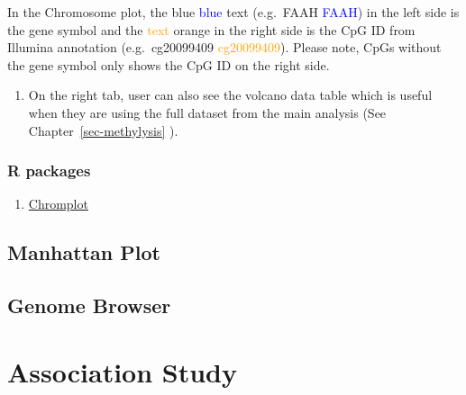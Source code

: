 \documentclass[
  a4paper,
  DIV=11,
  numbers=noendperiod,
  oneside,
  open=any]{scrreport}
\providecommand{\tightlist}{%
  \setlength{\itemsep}{0pt}\setlength{\parskip}{0pt}}\usepackage{longtable,booktabs,array}
\begin{document}
\begin{tcolorbox}[enhanced jigsaw, breakable, colback=white, colbacktitle=quarto-callout-note-color!10!white, opacityback=0, left=2mm, bottomrule=.15mm, opacitybacktitle=0.6, coltitle=black, bottomtitle=1mm, toprule=.15mm, toptitle=1mm, arc=.35mm, titlerule=0mm, rightrule=.15mm, title=\textcolor{quarto-callout-note-color}{\faInfo}\hspace{0.5em}{Note}, colframe=quarto-callout-note-color-frame, leftrule=.75mm]

In the Chromosome plot, the {blue} \textcolor{blue}{blue} text
(e.g.~{FAAH} \textcolor{blue}{FAAH}) in the left side is the gene symbol
and the \textcolor{orange}{text} {orange} in the right side is the CpG
ID from Illumina annotation (e.g.~{cg20099409}
\textcolor{orange}{cg20099409}). Please note, CpGs without the gene
symbol only shows the CpG ID on the right side.

\end{tcolorbox}

\begin{enumerate}
\def\labelenumi{\arabic{enumi}.}
\setcounter{enumi}{2}
\tightlist
\item
  On the right tab, user can also see the volcano data table which is
  useful when they are using the full dataset from the main analysis
  (See Chapter~\ref{sec-methylysis} ).
\end{enumerate}

\section{R packages}\label{r-packages}

\begin{enumerate}
\def\labelenumi{\arabic{enumi}.}
\tightlist
\item
  \href{https://www.bioconductor.org/packages/release/bioc/vignettes/chromPlot/inst/doc/chromPlot.pdf}{Chromplot}
\end{enumerate}

\chapter{Manhattan Plot}\label{manhattan-plot}

\chapter{Genome Browser}\label{genome-browser}

\part{Association Study}
\end{document}

